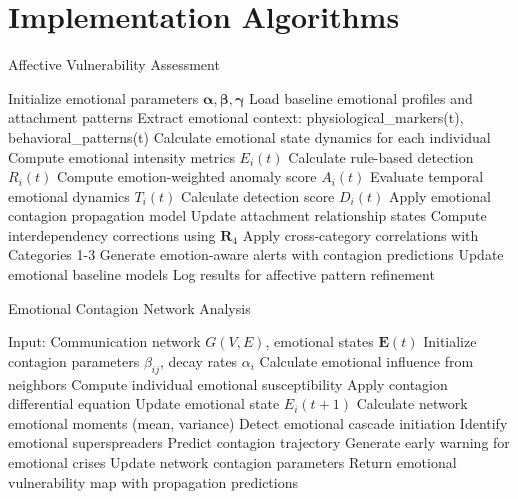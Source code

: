 \documentclass[11pt,a4paper]{article}
\begin{document}
\section{Implementation Algorithms}

\begin{algorithm}
\caption{Affective Vulnerability Assessment}
\begin{algorithmic}[1]
\STATE Initialize emotional parameters $\boldsymbol{\alpha}, \boldsymbol{\beta}, \boldsymbol{\gamma}$
\STATE Load baseline emotional profiles and attachment patterns
    \STATE Extract emotional context: physiological\_markers(t), behavioral\_patterns(t)
    \STATE Calculate emotional state dynamics for each individual
        \STATE Compute emotional intensity metrics $E_i(t)$
        \STATE Calculate rule-based detection $R_i(t)$
        \STATE Compute emotion-weighted anomaly score $A_i(t)$
        \STATE Evaluate temporal emotional dynamics $T_i(t)$
        \STATE Calculate detection score $D_i(t)$
        \STATE Apply emotional contagion propagation model
        \STATE Update attachment relationship states
    \ENDFOR
    \STATE Compute interdependency corrections using $\mathbf{R}_4$
    \STATE Apply cross-category correlations with Categories 1-3
    \STATE Generate emotion-aware alerts with contagion predictions
    \STATE Update emotional baseline models
    \STATE Log results for affective pattern refinement
\ENDFOR
\end{algorithmic}
\end{algorithm}

\begin{algorithm}
\caption{Emotional Contagion Network Analysis}
\begin{algorithmic}[1]
\STATE Input: Communication network $G(V,E)$, emotional states $\mathbf{E}(t)$
\STATE Initialize contagion parameters $\beta_{ij}$, decay rates $\alpha_i$
        \STATE Calculate emotional influence from neighbors
        \STATE Compute individual emotional susceptibility
        \STATE Apply contagion differential equation
        \STATE Update emotional state $E_i(t+1)$
    \ENDFOR
    \STATE Calculate network emotional moments (mean, variance)
    \STATE Detect emotional cascade initiation
    \STATE Identify emotional superspreaders
    \STATE Predict contagion trajectory
    \STATE Generate early warning for emotional crises
    \STATE Update network contagion parameters
\ENDFOR
\STATE Return emotional vulnerability map with propagation predictions
\end{algorithmic}
\end{algorithm}
\end{document}
